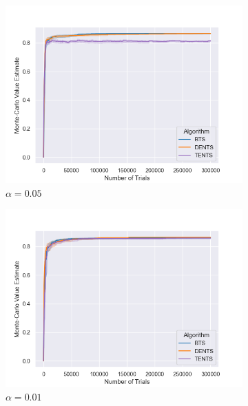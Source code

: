 \begin{figure}
                \begin{subfigure}[b]{0.32\textwidth}
                    \centering
                    \includegraphics[width=\textwidth]{figures/temp/fl_sens/056_fl8_0_05_03.png}
                    \caption{$\alpha=0.05$}
                \end{subfigure}
                \begin{subfigure}[b]{0.32\textwidth}
                    \centering
                    \includegraphics[width=\textwidth]{figures/temp/fl_sens/057_fl8_0_01_03.png}
                    \caption{$\alpha=0.01$}
                \end{subfigure}
                \begin{subfigure}[b]{0.32\textwidth}

\end{subfigure}
\end{figure}

